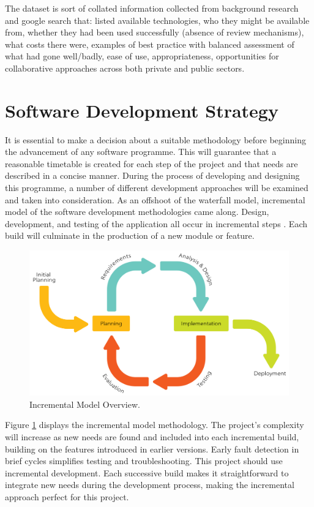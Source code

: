 The dataset is sort of collated information collected from background research and google search that: listed available technologies, who they might be available from, whether they had been used successfully (absence of review mechanisms), what costs there were, examples of best practice with balanced assessment of what had gone well/badly, ease of use, appropriateness, opportunities for collaborative approaches across both private and public sectors.

\section{Software Development Strategy}
It is essential to make a decision about a suitable methodology before beginning the advancement of any software programme. This will guarantee that a reasonable timetable is created for each step of the project and that needs are described in a concise manner. During the process of developing and designing this programme, a number of different development approaches will be examined and taken into consideration. As an offshoot of the waterfall model, incremental model of the software development methodologies came along. Design, development, and testing of the application all occur in incremental steps \citep{ana1}. Each build will culminate in the production of a new module or feature. 

\begin{figure}
	\includegraphics[width=\linewidth]{incremental}
	\caption{Incremental Model Overview.}
	\label{fig:2}
\end{figure}

Figure \ref{fig:2} displays the incremental model methodology. The project's complexity will increase as new needs are found and included into each incremental build, building on the features introduced in earlier versions. Early fault detection in brief cycles simplifies testing and troubleshooting. This project should use incremental development. Each successive build makes it straightforward to integrate new needs during the development process, making the incremental approach perfect for this project. 


